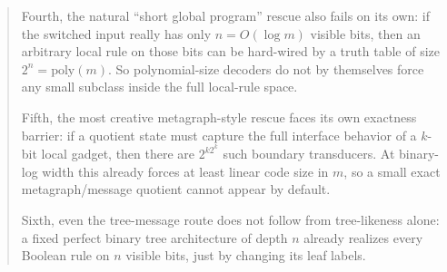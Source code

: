 \documentclass[11pt]{article}
\theoremstyle{remark}
\begin{document}
\begin{abstract}
Fourth, the natural ``short global program'' rescue also fails on its own: if the switched input
really has only \(n = O(\log m)\) visible bits, then an arbitrary local rule on those bits can be
hard-wired by a truth table of size \(2^n = \mathrm{poly}(m)\).  So polynomial-size decoders do
not by themselves force any small subclass inside the full local-rule space.

Fifth, the most creative metagraph-style rescue faces its own exactness barrier: if a quotient
state must capture the full interface behavior of a \(k\)-bit local gadget, then there are
\(2^{k2^k}\) such boundary transducers.  At binary-log width this already forces at least linear
code size in \(m\), so a small exact metagraph/message quotient cannot appear by default.

Sixth, even the tree-message route does not follow from tree-likeness alone: a fixed perfect
binary tree architecture of depth \(n\) already realizes every Boolean rule on \(n\) visible bits,
just by changing its leaf labels.


\end{abstract}
\end{document}

